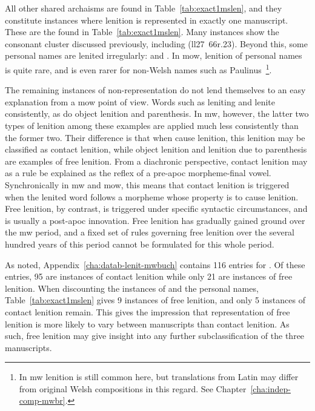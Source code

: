 All other shared archaisms are found in Table~\ref{tab:exact1mslen}, and they constitute instances where lenition is represented in exactly one manuscript. These are the found in Table~\ref{tab:exact1mslen}. Many instances show the consonant cluster  discussed previously, including  (\gls{ll27}~66r.23). Beyond this, some personal names  are lenited irregularly:  and  . In \gls{mow}, lenition of personal names is quite rare, and is even rarer for non-Welsh names such as Paulinus~\autocite[702]{thomas_gramadeg_1996}\footnote{In \gls{mw} lenition is still common here, but translations from Latin may differ from original Welsh compositions in this regard. See Chapter~\ref{cha:indep-comp-mwbr}.}. 

The remaining instances of non-representation do not lend themselves to an easy explanation from a \gls{mow} point of view. Words such as leniting  and  lenite  consistently, as do object lenition and parenthesis. In \gls{mw}, however, the latter two types of lenition among these examples are applied much less consistently than the former two. Their difference is that when  cause lenition, this lenition may be classified as contact lenition, while object lenition and lenition due to parenthesis are examples of free lenition. From a diachronic perspective, contact lenition may as a rule be explained as the reflex of a pre-\gls{apoc} morpheme-final vowel. Synchronically in \gls{mw} and \gls{mow}, this means that contact lenition is triggered when the lenited word follows a morpheme whose property is to cause lenition. Free lenition, by contrast, is triggered under specific syntactic circumstances, and is usually a post-\gls{apoc} innovation. Free lenition has gradually gained ground over the \gls{mw} period, and a fixed set of rules governing free lenition over the several hundred years of this period cannot be formulated for this whole period. 

As noted, Appendix~\ref{cha:datab-lenit-mwbuch} contains  116 entries for . Of these entries, 95 are instances of contact lenition while only 21 are instances of free lenition. When discounting the instances of  and the personal names, Table~\ref{tab:exact1mslen} gives 9 instances of free lenition, and only 5 instances of contact lenition remain. This gives the impression that representation of free lenition is more likely to vary between manuscripts than contact lenition. As such, free lenition may give insight into any further subclassification of the three manuscripts. 


